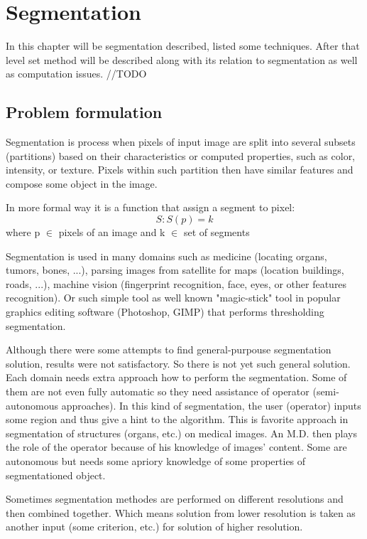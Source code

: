 \chapter{Segmentation}

In this chapter will be segmentation described, listed some techniques. After that level set method will be described along with its relation to segmentation as well as computation issues. //TODO

\section{Problem formulation}
Segmentation is process when pixels of input image are split into several subsets (partitions) based on their characteristics or computed properties, such as color, intensity, or texture. Pixels within such partition then have similar features and compose some object in the image.

In more formal way it is a function that assign a segment to pixel:
\begin{equation}
S: S(p) = k
\end{equation}
where p $\in$ pixels of an image and k $\in$ set of segments

Segmentation is used in many domains such as medicine (locating organs, tumors, bones, ...), parsing images from satellite for maps (location buildings, roads, ...), machine vision (fingerprint recognition, face, eyes, or other features recognition). Or such simple tool as well known "magic-stick" tool in popular graphics editing software (Photoshop, GIMP) that performs thresholding segmentation.

Although there were some attempts to find general-purpouse segmentation solution, results were not satisfactory. So there is not yet such general solution. Each domain needs extra approach how to perform the segmentation. Some of them are not even fully automatic so they need assistance of operator (semi-autonomous approaches). In this kind of segmentation, the user (operator) inputs some region and thus give a hint to the algorithm. This is favorite approach in segmentation of structures (organs, etc.) on medical images. An M.D. then plays the role of the operator because of his knowledge of images' content. Some are autonomous but needs some apriory knowledge of some properties of segmentationed object. 

Sometimes segmentation methodes are performed on different resolutions and then combined together. Which means solution from lower resolution is taken as another input (some criterion, etc.) for solution of higher resolution. 

